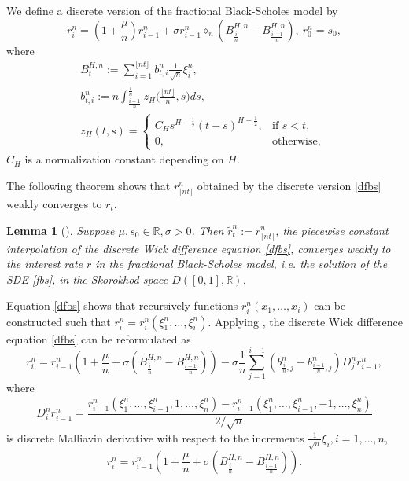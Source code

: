 \documentclass[10pt,a4paper]{amsart}
\numberwithin{equation}{section}
\newtheorem{lemma}[theo]{Lemma}
\begin{document}
We define a discrete version of the fractional Black-Scholes model by
\begin{equation}
\label{dfbs}
 r_i^n=\left(1+\frac{\mu}{n}\right) r_{i-1}^n+\sigma r_{i-1}^n \diamond_n\left(B_{\frac{i}{n}}^{H, n}-B_{\frac{i-1}{n}}^{H, n}\right), \ r_0^n=s_0,
\end{equation}
where
\begin{gather*}
 B_t^{H, n}:=\sum_{i=1}^{\lfloor n t\rfloor} b_{t, i}^n \frac{1}{\sqrt{n}} \xi_i^n,\\
 b_{t, i}^n:=n \int_{\frac{i-1}{n}}^{\frac{i}{n}} z_H
 \Big(\frac{\lfloor n t\rfloor}{n}, s\Big) d s, \\
 z_H(t,s)
  = \begin{cases}C_H s^{H-\frac{1}{2}}(t-s)^{H-\frac{1}{2}},
   & \text{if } s<t, \\ 
   0, & \text{otherwise, }
   \end{cases}
\end{gather*}
$ C_H$ is a normalization constant depending on $H$.

The following theorem shows that $r_{\lfloor n t\rfloor}^n$ obtained by the 
discrete version \eqref{dfbs} weakly converges to $r_t$.

\begin{lemma}[{\cite[Theorem 1.4]{bender2012connection}}]
Suppose $\mu, s_0 \in \mathbb{R}, \sigma>0$. 
Then $\widetilde{r}_t^n:=r_{\lfloor n t\rfloor}^n$, the piecewise constant 
interpolation of the discrete Wick difference equation \eqref{dfbs}, converges weakly
to the interest rate $r$ in the fractional Black-Scholes model, i.e. the solution of 
the SDE \eqref{fbs}, in the Skorokhod space $D([0,1], \mathbb{R})$.
\end{lemma}

Equation \eqref{dfbs} shows that recursively functions 
$r_{i}^n\left(x_1,\dots, x_i\right)$ can be constructed such that
$r_{i}^n=r_{i}^n\left(\xi_1^n,\dots, \xi_i^n\right)$.
Applying \cite[Lemma 1.3]{bender2012connection}, the discrete Wick difference 
equation \eqref{dfbs} can be reformulated as
\begin{equation}
\label{wffbs}
 r_i^n=r_{i-1}^n\left(1+\frac{\mu}{n}+\sigma\left(B_{\frac{i}{n}}^{H, n}
 -B_{\frac{i-1}{n}}^{H, n}\right)\right)-\sigma \frac{1}{n} \sum_{j=1}^{i-1}
 \left(b_{\frac{i}{n}, j}^n-b_{\frac{i-1}{n}, j}^n\right) D_j^n r_{i-1}^n ,
\end{equation}
where
\begin{equation}
 D_i^n r_{i-1}^n=\frac{r_{i-1}^n\left(\xi_1^n, \dots,
 \xi_{i-1}^n, 1, \dots, \xi_n^n\right)-r_{i-1}^n\left(\xi_1^n,
 \dots, \xi_{i-1}^n,-1, \dots, \xi_n^n\right)}{2 / \sqrt{n}}
\end{equation}
is discrete Malliavin derivative with respect to the increments 
$\frac{1}{\sqrt{n}} \xi_i, i=1, \dots, n$,
\[
r_i^n=r_{i-1}^n\left(1+\frac{\mu}{n}+\sigma
\left(B_{\frac{i}{n}}^{H, n}-B_{\frac{i-1}{n}}^{H, n}\right)\right).
\]
\end{document}
